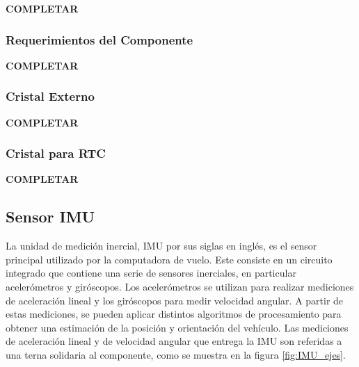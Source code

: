 



\textbf{{\color{red} COMPLETAR}}



\subsubsection{Requerimientos del Componente}

\textbf{{\color{red} COMPLETAR}}


\subsubsection{Cristal Externo}

\textbf{{\color{red} COMPLETAR}}

\subsubsection{Cristal para RTC}

\textbf{{\color{red} COMPLETAR}}

\subsection{Sensor IMU}

La unidad de medición inercial, IMU por sus siglas en inglés, es el sensor principal utilizado por la computadora de vuelo. Este consiste en un circuito integrado que contiene una serie de sensores inerciales, en particular acelerómetros y giróscopos. Los acelerómetros se utilizan para realizar mediciones de aceleración lineal y los giróscopos para medir velocidad angular. A partir de estas mediciones, se pueden aplicar distintos algoritmos de procesamiento para obtener una estimación de la posición y orientación del vehículo. Las mediciones de aceleración lineal y de velocidad angular que entrega la IMU son referidas a una terna solidaria al componente, como se muestra en la figura \ref{fig:IMU_ejes}.

